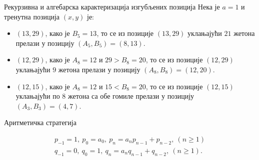 \documentclass[10pt]{beamer}
\DeclareMathOperator{\comma}{,}
\DeclareMathOperator{\leftbracket}{[}
\DeclareMathOperator{\rightbracket}{]}
\begin{document}
	
	\begin{frame}{Рекурзивна и алгебарска карактеризација изгубљених позиција}
		Нека је $ a = 1 $ и тренутна позиција $ (x, y) $ је:
		\begin{itemize}
			\item $ (13, 29) $, како је $ B_{5} = 13 $, то се из позиције $ (13, 29) $ уклањајући $ 21 $ жетона прелази у позицију $ (A_{5}, B_{5}) = (8, 13) $. 
			\item $ (12, 29) $, како је $ A_{8} = 12 $ и $ 29 > B_{8} = 20 $, то се из позиције $ (12, 29) $ уклањајући $ 9 $ жетона прелази у позицију $ (A_{8}, B_{8}) = (12, 20) $.
			\item $ (12, 15) $, како је $ A_{8} = 12 $ и $ 15 < B_{8} = 20 $, то се из позиције $ (12, 15) $ уклањајући по $ 8 $ жетона са обе гомиле прелази у позицију $ (A_{3}, B_{3}) = (4, 7) $.
		\end{itemize}
	\end{frame}
	
	
	\begin{frame}{Аритметичка стратегија}
		\begin{tcolorbox}
			[title=Нека је $ \leftbracket a_{0}\comma a_{1}\comma a_{2}\comma \ldots \rightbracket $ верижни развој броја $ \alpha $ и за низове $ p_{n} $ и $ q_{n} $ важи следећа рекурентна релација:]
			\begin{eqnarray}
			p_{-1} = 1,\ p_{0} = a_{0},\ p_{n} = a_{n}p_{n-1} + p_{n-2},\ (n \geq 1 )\\
			q_{-1} = 0,\ q_{0} = 1,\ q_{n} = a_{n}q_{n-1} + q_{n-2},\ (n \geq 1 ).
			\end{eqnarray}
		\end{tcolorbox}
	\end{frame}
\end{document}
